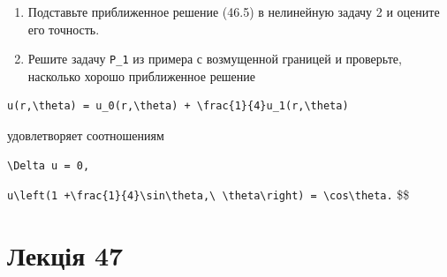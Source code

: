 \documentclass[
  ukrainian,
]{article}
\begin{document}
\begin{enumerate}
\def\labelenumi{\arabic{enumi}.}
\setcounter{enumi}{2}
\item
  Подставьте приближенное решение (46.5) в нелинейную задачу 2 и оцените
  его точность.
\item
  Решите задачу \texttt{P\_1} из примера с возмущенной границей и
  проверьте, насколько хорошо приближенное решение
\end{enumerate}

\begin{verbatim}
u(r,\theta) = u_0(r,\theta) + \frac{1}{4}u_1(r,\theta)
\end{verbatim}

удовлетворяет соотношениям

\begin{verbatim}
\Delta u = 0,
\end{verbatim}

\texttt{u\textbackslash{}left(1\ +\textquotesingle{}\textbackslash{}frac\{1\}\{4\}\textbackslash{}sin\textbackslash{}theta,\textbackslash{}\ \textbackslash{}theta\textbackslash{}right)\ =\ \textbackslash{}cos\textbackslash{}theta\textquotesingle{}.}
\$\$

\section{Лекція 47}\label{ux43bux435ux43aux446ux456ux44f-47}
\end{document}
